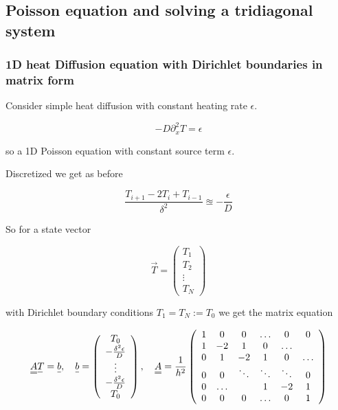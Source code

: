 \subsection{Poisson equation and solving a tridiagonal system}
\subsubsection{1D heat Diffusion equation with Dirichlet boundaries in matrix form}
Consider simple heat diffusion with constant heating rate $\epsilon$.

\begin{equation}
    -D \partial_x^2 T = \epsilon
\end{equation}

so a 1D Poisson equation with constant source term $\epsilon$.

Discretized we get as before

\begin{equation}
    \frac{T_{i+1}-2T_i + T_{i-1}}{\delta^2} \approxeq -\frac{\epsilon}{D}
\end{equation}

So for a state vector

\begin{equation}
    \vec{T} = \left( \begin{array}{c} T_1 \\ T_2 \\ \vdots \\ T_N \end{array} \right)
\end{equation}

with Dirichlet boundary conditions $T_1 = T_N := T_0$ we get the matrix equation

\begin{equation}
    \mat{A} \vec{T} = \vec{b}, \quad \vec{b} = \left( \begin{array}{c} T_0 \\ -\frac{\delta^2 \epsilon}{D} \\ \vdots \\ -\frac{\delta^2 \epsilon}{D} \\ T_0 \end{array} \right), \quad \mat{A} = \frac{1}{h^2} \left( \begin{array}{cccccc}
        1 & 0 & 0 & \dots & 0 & 0 \\
        1 & -2 & 1 & 0 & \dots &  \\
        0 & 1 & -2 & 1 & 0 & \dots \\
        0 & 0 & \ddots & \ddots & \ddots & 0 \\
        0 & \dots &  & 1 & -2 & 1 \\
        0 & 0 & 0 & \dots & 0 & 1
    \end{array} \right)
\end{equation}

